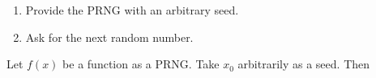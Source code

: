 \documentclass[12pt,a4paper]{article}
\begin{document}
\begin{enumerate}
	
	\item Provide the PRNG with an arbitrary seed.
	
	\item Ask for the next random number.

\end{enumerate}

Let $f(x)$ be a function as a PRNG. Take $x_{0}$ arbitrarily as a seed. Then





\end{document}
